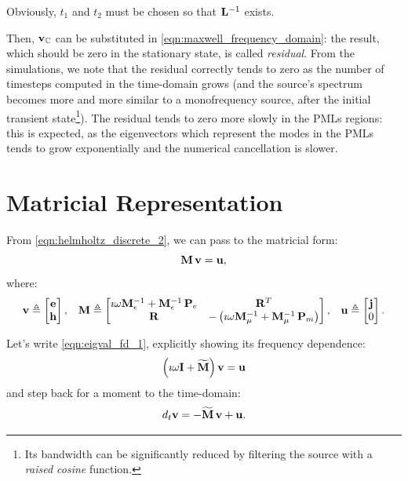 Obviously, $t_1$ and $t_2$ must be chosen so that $\mathbf{L}^{-1}$
exists.

Then, $\mathbf{v}_{\mathbb{C}}$ can be substituted in
\eqref{eqn:maxwell_frequency_domain}: the result, which should be zero
in the stationary state, is called \emph{residual}. From the
simulations, we note that the residual correctly tends to zero as the
number of timesteps computed in the time-domain grows (and the
source's spectrum becomes more and more similar to a monofrequency
source, after the initial transient state\footnote{Its bandwidth can
be significantly reduced by filtering the source with a \emph{raised
cosine} function.}). The residual tends to zero more slowly in the
PMLs regions: this is expected, as the eigenvectors which represent
the modes in the PMLs tends to grow exponentially and the numerical
cancellation is slower.

\section{Matricial Representation}

From \eqref{eqn:helmholtz_discrete_2}, we can pass to the matricial
form:
\begin{equation} \label{eqn:eigval_fd_1}
  {\mathbf{M}\,\mathbf{v}} = \mathbf{u} ,
\end{equation}
where:
\begin{align*}
  \mathbf{v} \triangleq \begin{bmatrix} \mathbf{e} \\ \mathbf{h} \end{bmatrix}, &&
  \mathbf{M} \triangleq \begin{bmatrix}
    \imath \omega \mathbf{M}_\epsilon^{-1} +
    {\mathbf{M}_\epsilon^{-1}\,\mathbf{P}_e} &
    {\mathbf{R}}^T \\
    \mathbf{R} &
    - \left( \imath \omega \mathbf{M}_\mu^{-1} +
  {\mathbf{M}_\mu^{-1}\,\mathbf{P}_m} \right)
  \end{bmatrix}, &&
  \mathbf{u} \triangleq \begin{bmatrix} \mathbf{j} \\ 0 \end{bmatrix} .
\end{align*}

Let's write \eqref{eqn:eigval_fd_1}, explicitly showing its frequency
dependence:
\begin{equation} \label{eqn:eigval_fd_2}
  \left( \imath \omega \mathbf{I} + \widetilde{\mathbf{M}} \right) \mathbf{v} = \mathbf{u}
\end{equation}
and step back for a moment to the time-domain:
\begin{equation} \label{eqn:eigval_fd_3}
  d_t \mathbf{v} = -{\widetilde{\mathbf{M}}\,\mathbf{v}} + \mathbf{u} .
\end{equation}

